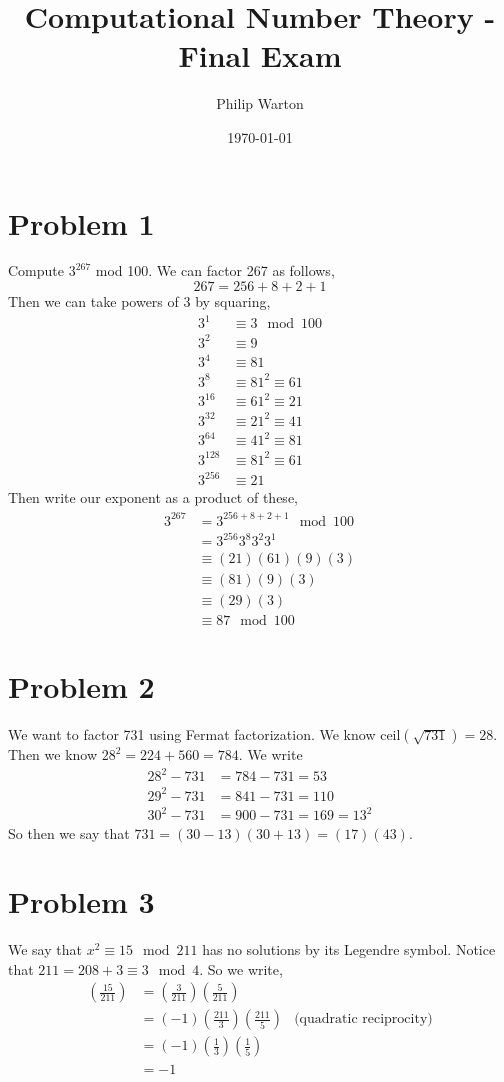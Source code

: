 \documentclass{article}
\theoremstyle{definition}
\begin{document}
\title{Computational Number Theory - Final Exam}
\author{Philip Warton}
\date{\today}
\maketitle
\section*{Problem 1}
Compute $3^{267}$ mod 100.
We can factor 267 as follows,
\[ 
    267 = 256 + 8 + 2 + 1
\]
Then we can take powers of $3$ by squaring,
\begin{align*}
    3^1 &\equiv 3 \mod{100}\\
    3^2 &\equiv 9 \\
    3^4 &\equiv 81 \\
    3^8 &\equiv 81^2 \equiv 61 \\
    3^{16} &\equiv 61^2 \equiv 21 \\
    3^{32} &\equiv 21^2 \equiv 41 \\
    3^{64} &\equiv 41^2 \equiv 81 \\
    3^{128} &\equiv 81^2 \equiv 61 \\
    3^{256} &\equiv 21
\end{align*}
Then write our exponent as a product of these,
\begin{align*}
    3^{267} &= 3^{256 + 8 + 2 + 1} \mod{100}\\
    & = 3^{256} 3^{8} 3^{2} 3^1 \\
    &\equiv (21)(61)(9)(3) \\
    &\equiv (81)(9)(3) \\
    &\equiv (29)(3) \\
    &\equiv 87 \mod{100}
\end{align*}
\section*{Problem 2}
We want to factor 731 using Fermat factorization. We know ceil$(\sqrt{731})=28$. Then we know 
$28^2 = 224 + 560 = 784$. We write 
\begin{align*}
    28^2 - 731 &= 784 - 731 = 53 \\
    29^2 - 731 &= 841 - 731 = 110 \\
    30^2 - 731 &= 900 - 731 = 169 = 13^2
\end{align*}
So then we say that $731 = (30 - 13)(30 + 13) = (17)(43)$.
\section*{Problem 3}
We say that $x^2 \equiv 15 \mod {211}$ has no solutions by its Legendre symbol. Notice that $211 = 208 + 3 \equiv 3 \mod{4}$.
So we write,
\begin{align*}
    \left(\frac{15}{211}\right) &= \left(\frac{3}{211}\right)\left(\frac{5}{211}\right)\\
    &= (-1)\left(\frac{211}{3}\right)\left(\frac{211}{5}\right) & \text{(quadratic reciprocity)}\\
    &= (-1)\left(\frac{1}{3}\right)\left(\frac{1}{5}\right)\\
    &= -1
\end{align*}
\end{document}
